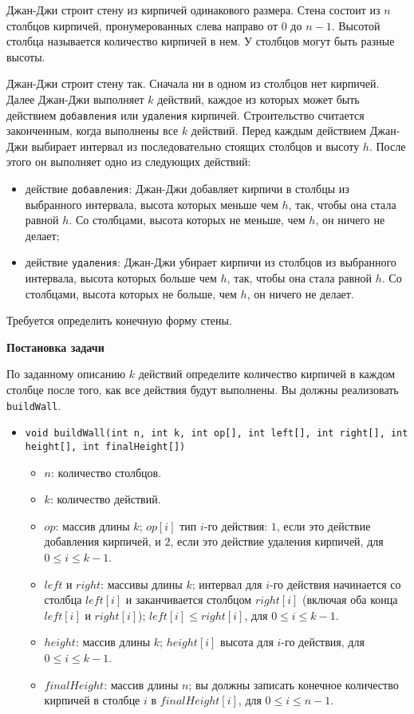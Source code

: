 Джан-Джи строит стену из кирпичей одинакового размера. Стена состоит из $n$ столбцов
кирпичей, пронумерованных слева направо от $0$ до $n - 1$. Высотой столбца называется
количество кирпичей в нем. У столбцов могут быть разные высоты.

Джан-Джи строит стену так. Сначала ни в одном из столбцов нет кирпичей. Далее Джан-Джи
выполняет $k$ действий, каждое из которых может быть действием \texttt{добавления} или \texttt{удаления} кирпичей. Строительство считается законченным, когда выполнены все $k$ действий. Перед каждым действием Джан-Джи выбирает интервал из последовательно стоящих столбцов и высоту $h$. После этого он выполняет одно из следующих действий:

\begin{itemize}
\item действие \texttt{добавления}: Джан-Джи добавляет кирпичи в столбцы из выбранного интервала, высота которых меньше чем $h$, так, чтобы она стала равной $h$. Со столбцами, высота которых не меньше, чем $h$, он ничего не делает;
\item действие \texttt{удаления}: Джан-Джи убирает кирпичи из столбцов из выбранного интервала, высота которых больше чем $h$, так, чтобы она стала равной $h$. Со столбцами, высота которых не больше, чем $h$, он ничего не делает.
\end{itemize}

Требуется определить конечную форму стены.

\textbf{Постановка задачи}

По заданному описанию $k$ действий определите количество кирпичей в каждом столбце после
того, как все действия будут выполнены. Вы должны реализовать \texttt{buildWall}.

\begin{itemize} 
\item \texttt{void buildWall(int n, int k, int op[], int left[], int right[],
int height[], int finalHeight[])}
\begin{itemize} 
\item $n$: количество столбцов.
\item $k$: количество действий.
\item $op$: массив длины $k$; $op[i]$ тип $i$-го действия: $1$, если это действие добавления кирпичей, и $2$, если это действие удаления кирпичей, для $0 \le i \le k - 1$.
\item $left$ и $right$: массивы длины $k$; интервал для $i$-го действия начинается со
столбца $left[i]$ и заканчивается столбцом $right[i]$ (включая оба конца
$left[i]$ и $right[i]$); $left[i] \le right[i]$, для $0 \le i \le k - 1$.
\item $height$: массив длины $k$; $height[i]$ высота для $i$-го действия, для $0 \le i \le k - 1$.
\item $finalHeight$: массив длины $n$; вы должны записать конечное количество
кирпичей в столбце $i$ в $finalHeight[i]$, для $0 \le i \le n - 1$.
\end{itemize}
\end{itemize}